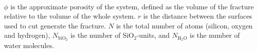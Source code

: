 \begin{table}[htpb]
{        \\%
%
        $\phi$ is the approximate porosity of the system, defined as the volume of the fracture relative to the volume of the whole system. $r$ is the distance between the surfaces used to cut generate the fracture. $N$ is the total number of atoms (silicon, oxygen and hydrogen), $N_\text{SiO$_2$}$ is the number of SiO$_2$-units, and $N_\text{H$_2$O}$ is the number of water molecules. %
%
        \label{tab:systems}%
    }
\end{table}%

